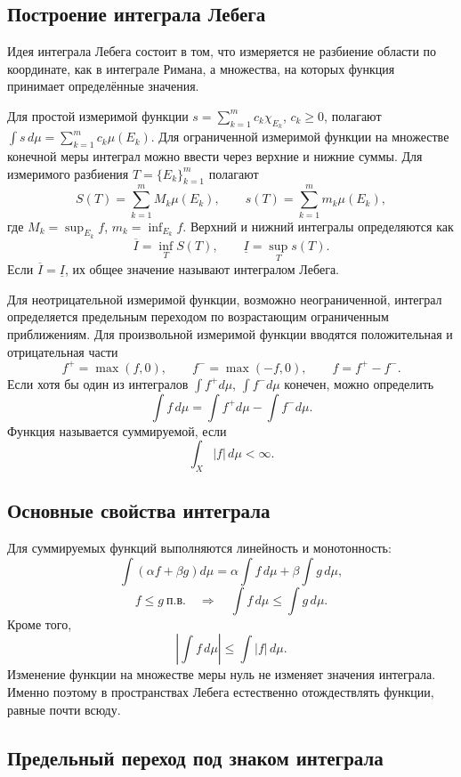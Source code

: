 \subsection{Построение интеграла Лебега}

Идея интеграла Лебега состоит в том, что измеряется не разбиение области по
координате, как в интеграле Римана, а множества, на которых функция принимает
определённые значения.

Для простой измеримой функции
$s=\sum_{k=1}^{m}c_k\chi_{E_k}$, $c_k\geq0$, полагают
$\int s\,d\mu=\sum_{k=1}^{m}c_k\mu(E_k)$. Для ограниченной измеримой
функции на множестве конечной меры интеграл можно ввести через верхние и нижние
суммы. Для измеримого разбиения
$T=\{E_k\}_{k=1}^m$ полагают
\[
    S(T)=\sum_{k=1}^{m}M_k\mu(E_k),\qquad
    s(T)=\sum_{k=1}^{m}m_k\mu(E_k),
\]
где $M_k=\sup_{E_k}f$, $m_k=\inf_{E_k}f$. Верхний и нижний интегралы
определяются как
\[
    \overline I=\inf_T S(T),\qquad
    \underline I=\sup_T s(T).
\]
Если $\overline I=\underline I$, их общее значение называют интегралом Лебега.

Для неотрицательной измеримой функции, возможно неограниченной, интеграл
определяется предельным переходом по возрастающим ограниченным приближениям.
Для произвольной измеримой функции вводятся положительная и отрицательная части
\[
    f^+=\max(f,0),\qquad f^-=\max(-f,0),\qquad f=f^+-f^-.
\]
Если хотя бы один из интегралов $\int f^+d\mu$, $\int f^-d\mu$ конечен, можно
определить
\[
    \int f\,d\mu=\int f^+d\mu-\int f^-d\mu.
\]
Функция называется суммируемой, если
\[
    \int_X|f|\,d\mu<\infty.
\]

\subsection{Основные свойства интеграла}

Для суммируемых функций выполняются линейность и монотонность:
\[
    \int(\alpha f+\beta g)d\mu
      =\alpha\int f\,d\mu+\beta\int g\,d\mu,
\]
\[
    f\leq g\ \text{п.в.}\quad\Rightarrow\quad
    \int f\,d\mu\leq\int g\,d\mu.
\]
Кроме того,
\[
    \left|\int f\,d\mu\right|
    \leq\int|f|\,d\mu.
\]
Изменение функции на множестве меры нуль не изменяет значения интеграла.
Именно поэтому в пространствах Лебега естественно отождествлять функции,
равные почти всюду.

\subsection{Предельный переход под знаком интеграла}

